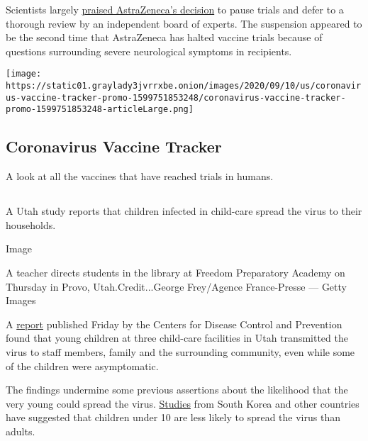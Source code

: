Scientists largely
\href{https://www.nytimes3xbfgragh.onion/2020/09/10/health/covid-astrazeneca-vaccine-trans.html}{praised
AstraZeneca's decision} to pause trials and defer to a thorough review
by an independent board of experts. The suspension appeared to be the
second time that AstraZeneca has halted vaccine trials because of
questions surrounding severe neurological symptoms in recipients.

\href{https://www.nytimes3xbfgragh.onion/interactive/2020/science/coronavirus-vaccine-tracker.html}{}

\texttt{[image: https://static01.graylady3jvrrxbe.onion/images/2020/09/10/us/coronavirus-vaccine-tracker-promo-1599751853248/coronavirus-vaccine-tracker-promo-1599751853248-articleLarge.png]}

\hypertarget{coronavirus-vaccine-tracker}{%
\subsection{Coronavirus Vaccine
Tracker}\label{coronavirus-vaccine-tracker}}

A look at all the vaccines that have reached trials in humans.

\hypertarget{-2}{%
\subsection{}\label{-2}}

A Utah study reports that children infected in child-care spread the
virus to their households.

Image

A teacher directs students in the library at Freedom Preparatory Academy
on Thursday in Provo, Utah.Credit...George Frey/Agence France-Presse ---
Getty Images

A \href{https://www.cdc.gov/mmwr/volumes/69/wr/mm6937e3.htm}{report}
published Friday by the Centers for Disease Control and Prevention found
that young children at three child-care facilities in Utah transmitted
the virus to staff members, family and the surrounding community, even
while some of the children were asymptomatic.

The findings undermine some previous assertions about the likelihood
that the very young could spread the virus.
\href{https://www.nytimes3xbfgragh.onion/2020/07/18/health/coronavirus-children-schools.html\#:~:text=A\%20large\%20new\%20study\%20from,as\%20well\%20as\%20adults\%20do}{Studies}
from South Korea and other countries have suggested that children under
10 are less likely to spread the virus than adults.

